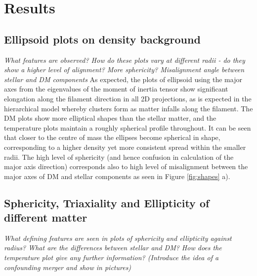 \documentclass[journal]{IEEEtran}
\begin{document}
\section{Results}
\subsection{Ellipsoid plots on density background}
\textit{What features are observed? How do these plots vary at different radii - do they show a higher level of alignment? More sphericity? 
Misalignment angle between stellar and DM components}
As expected, the plots of ellipsoid using the major axes from the eigenvalues of the moment of inertia tensor show significant elongation along the filament direction in all 2D projections, as is expected in the hierarchical model whereby clusters form as matter infalls along the filament. The DM plots show more elliptical shapes than the stellar matter, and the temperature plots maintain a roughly spherical profile throughout. It can be seen that closer to the centre of mass the ellipses become spherical in shape, corresponding to a higher density yet more consistent spread within the smaller radii. 
The high level of sphericity (and hence confusion in calculation of the major axis direction) corresponds also to high level of misalignment between the major axes of DM and stellar components as seen in Figure \ref{fig:shapes} a). 

\subsection{Sphericity, Triaxiality and Ellipticity of different matter}
\textit{What defining features are seen in plots of sphericity and ellipticity against radius? What are the differences between stellar and DM? How does the temperature plot give any further information?
(Introduce the idea of a confounding merger and show in pictures)}
\end{document}

